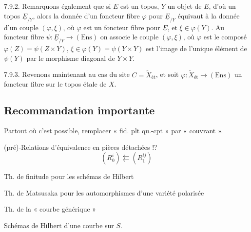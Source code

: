 \documentclass[11pt,a4paper]{article}
\begin{document}

7.9.2. \quad Remarquons également que si $\underline{E}$ est un topos, $Y$ un
objet de $\underline{E}$, d'où un topos $\underline{E}_{/Y}$, alors la donnée
d'un foncteur fibre $\varphi$ pour $\underline{E}_{/Y}$ équivaut à la donnée
d'un couple $(\varphi, \xi)$, où $\varphi$ est un foncteur fibre pour
$\underline{E}$, et $\xi \in \varphi(Y)$. Au foncteur fibre $\psi :
\underline{E}_{/Y} \longrightarrow (\mathrm{Ens})$ on associe le couple
$(\varphi, \xi)$, où $\varphi$ est le composé $\varphi(Z) = \psi(Z \times Y)$,
$\xi \in \varphi(Y) = \psi(Y \times Y)$ est l'image de l'unique élément de
$\psi(Y)$ par le morphisme diagonal de $Y \times Y$.

7.9.3. \quad Revenons maintenant au cas du site $C = \widetilde{X}_{\text{ét}}$,
et soit $\varphi : \widetilde{X}_{\text{ét}} \longrightarrow (\mathrm{Ens})$ un
foncteur fibre sur le topos étale de $X$.



\subsection*{Recommandation importante}

Partout où c'est possible, remplacer « fid. plt qu.-cpt » par « couvrant ».


(pré)-Relations d'équivalence en pièces détachées !?
\[
  (R_0^{i}) \leftleftarrows (R_1^{ij})
\]




Th. de finitude pour les schémas de Hilbert

Th. de Matsusaka pour les automorphismes d'une variété polarisée

Th. de la  « courbe générique » 

Schémas de Hilbert d'une courbe \struck{\ill{}} sur $S$.
\end{document}
